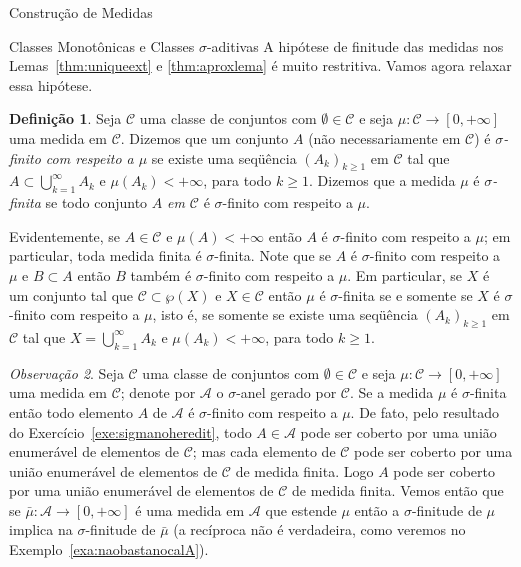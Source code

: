 \documentclass[oneside,final,11pt]{amsbook}
\theoremstyle{remark}\newtheorem{exercise}{Exercício}[chapter]
\theoremstyle{remark}\newtheorem{*exercise}[exercise]{\hbox to 0pt{\hskip 0pt minus 1fil*}Exercício}
\theoremstyle{definition}\newtheorem{exdefin}{Definição}[chapter]
\theoremstyle{plain}\newtheorem{teo}{Teorema}[section]
\theoremstyle{plain}\newtheorem{lem}[teo]{Lema}
\theoremstyle{plain}\newtheorem{prop}[teo]{Proposição}
\theoremstyle{plain}\newtheorem{cor}[teo]{Corolário}
\theoremstyle{definition}\newtheorem{defin}[teo]{Definição}
\theoremstyle{remark}\newtheorem{rem}[teo]{Observação}
\theoremstyle{definition}\newtheorem{notation}[teo]{Notação}
\theoremstyle{definition}\newtheorem{convention}[teo]{Convenção}
\theoremstyle{definition}\newtheorem{example}[teo]{Exemplo}
\numberwithin{section}{chapter}
\numberwithin{equation}{section}
\begin{document}
\begin{chapter}{Construção de Medidas}
\begin{section}{Classes Monotônicas e Classes ${\sigma}$-aditivas}
A hipótese de finitude das medidas nos Lemas~\ref{thm:uniqueext} e \ref{thm:aproxlema}
é muito restritiva. Vamos agora relaxar essa hipótese.
\begin{defin}
Seja $\mathcal C$ uma classe de conjuntos com $\emptyset\in\mathcal C$
e seja $\mu:\mathcal C\to[0,+\infty]$ uma medida em $\mathcal C$. Dizemos que
um conjunto $A$ (não necessariamente em $\mathcal C$) é
{\em $\sigma$-finito com respeito a $\mu$\/}%
 se existe uma seqüência $(A_k)_{k\ge1}$
em $\mathcal C$ tal que $A\subset\bigcup_{k=1}^\infty A_k$ e $\mu(A_k)<+\infty$, para todo
$k\ge1$. Dizemos que a medida $\mu$ é {\em $\sigma$-finita\/}%
 se todo conjunto $A$ {\em em $\mathcal C$\/}
é $\sigma$-finito com respeito a $\mu$.
\end{defin}
Evidentemente, se $A\in\mathcal C$ e $\mu(A)<+\infty$ então $A$ é $\sigma$-finito
com respeito a $\mu$; em particular, toda medida finita é $\sigma$-finita.
Note que se $A$ é $\sigma$-finito com respeito a $\mu$ e $B\subset A$
então $B$ também é $\sigma$-finito com respeito a $\mu$. Em particular,
se $X$ é um conjunto tal que $\mathcal C\subset\wp(X)$ e $X\in\mathcal C$ então
$\mu$ é $\sigma$-finita se e somente se $X$ é $\sigma$-finito com respeito a $\mu$, isto é,
se somente se existe uma seqüência $(A_k)_{k\ge1}$ em $\mathcal C$ tal que $X=\bigcup_{k=1}^\infty A_k$
e $\mu(A_k)<+\infty$, para todo $k\ge1$.

\begin{rem}\label{thm:tambemehsigmafin}
Seja $\mathcal C$ uma classe de conjuntos com $\emptyset\in\mathcal C$
e seja $\mu:\mathcal C\to[0,+\infty]$ uma medida em $\mathcal C$; denote
por $\mathcal A$ o $\sigma$-anel gerado por $\mathcal C$. Se a medida $\mu$ é
$\sigma$-finita então todo elemento $A$ de $\mathcal A$ é
$\sigma$-finito com respeito a $\mu$. De fato, pelo resultado do Exercício~\ref{exe:sigmanoheredit},
todo $A\in\mathcal A$ pode ser coberto por uma união
enumerável de elementos de $\mathcal C$; mas cada elemento de $\mathcal C$ pode ser coberto
por uma união enumerável de elementos de $\mathcal C$ de medida finita. Logo $A$ pode
ser coberto por uma união enumerável de elementos de $\mathcal C$ de medida finita.
Vemos então que se $\bar\mu:\mathcal A\to[0,+\infty]$ é uma medida em $\mathcal A$ que estende $\mu$
então a $\sigma$-finitude de $\mu$ implica na $\sigma$-finitude de $\bar\mu$ (a recíproca
não é verdadeira, como veremos no Exemplo~\ref{exa:naobastanocalA}).
\end{rem}


\end{section}
\end{chapter}
\end{document}
